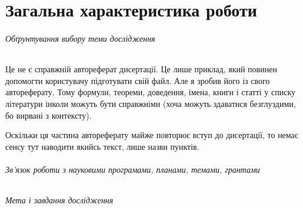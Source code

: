 \documentclass[
]{mon2017dev-aref}[2021/04/12]
\theoremstyle{plain}
\theoremstyle{definition}
\theoremstyle{remark}
\begin{document}

\maketitle


\part{Загальна характеристика роботи}

\paragraph{Обґрунтування вибору теми дослідження}

Це не є справжній автореферат дисертації. Це лише приклад, який
повинен допомогти користувачу підготувати свій файл. Але я зробив
його із свого автореферату. Тому формули, теореми, доведення,
імена, книги і статті у списку літератури інколи можуть бути
справжніми (хоча можуть здаватися безглуздими, бо вирвані з
контексту).

Оскільки ця частина автореферату майже повторює вступ до
дисертації, то немає сенсу тут наводити якийсь текст, лише назви
пунктів.

\paragraph{Зв'язок роботи з науковими програмами, планами, темами, грантами}

\paragraph{Мета і завдання дослідження}
\end{document}
